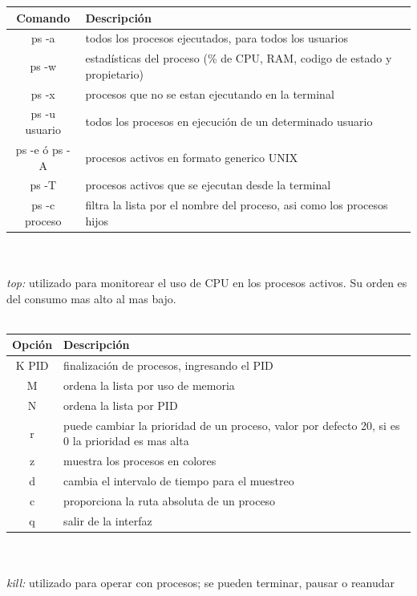 \documentclass[10pt,a4paper,titlepage]{article}
\begin{document}
	\begin{tabular}{|c|p{8cm}|}
		\hline
		Comando & Descripción \\
		\hline
		ps -a & todos los procesos ejecutados, para todos los usuarios \\
		\hline
		ps -w & estadísticas del proceso (\% de CPU, RAM, codigo de estado y propietario) \\
		\hline
		ps -x & procesos que no se estan ejecutando en la terminal \\
		\hline
		ps -u usuario & todos los procesos en ejecución de un determinado usuario \\
		\hline
		ps -e ó ps -A & procesos activos en formato generico UNIX \\
		\hline
		ps -T & procesos activos que se ejecutan desde la terminal \\
		\hline
		ps -c proceso & filtra la lista por el nombre del proceso, asi como los procesos hijos \\
		\hline
	\end{tabular}
	\\
	\\
	\emph{top:} utilizado para monitorear el uso de CPU en los procesos activos. Su orden es del consumo mas alto al mas bajo.
	\\
	\\
	\begin{tabular}{|c|p{8cm}|}
		\hline
		Opción & Descripción \\
		\hline
		K PID & finalización de procesos, ingresando el PID \\
		\hline
		M & ordena la lista por uso de memoria \\
		\hline
		N & ordena la lista por PID \\
		\hline
		r & puede cambiar la prioridad de un proceso, valor por defecto 20, si es 0 la prioridad es mas alta \\
		\hline
		z & muestra los procesos en colores \\
		\hline
		d & cambia el intervalo de tiempo para el muestreo \\
		\hline
		c & proporciona la ruta absoluta de un proceso \\
		\hline
		q & salir de la interfaz \\
		\hline
	\end{tabular}
	\\
	\\
	\emph{kill:} utilizado para operar con procesos; se pueden terminar, pausar o reanudar
	\\
\end{document}
